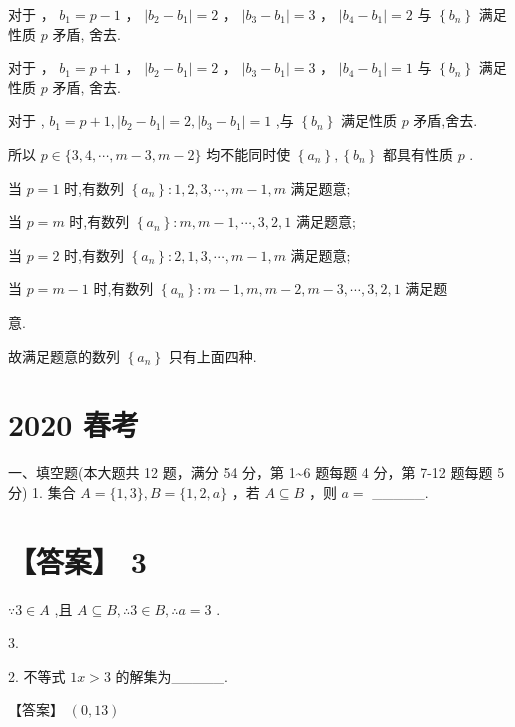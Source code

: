 \documentclass[10pt]{article}
\newcommand*\circled[1]{\tikz[baseline=(char.base)]{\node[shape=circle,draw,inner sep=1.5pt] (char) {\small #1};}}
\begin{document}
对于 \circled{2} ， \({b}_{1} = p - 1\) ， \(\left| {{b}_{2} - {b}_{1}}\right|  = 2\) ， \(\left| {{b}_{3} - {b}_{1}}\right|  = 3\) ， \(\left| {{b}_{4} - {b}_{1}}\right|  = 2\) 与 \(\left\{  {b}_{n}\right\}\) 满足性质 \(p\) 矛盾, 舍去.

对于 \circled{3} ， \({b}_{1} = p + 1\) ， \(\left| {{b}_{2} - {b}_{1}}\right|  = 2\) ， \(\left| {{b}_{3} - {b}_{1}}\right|  = 3\) ， \(\left| {{b}_{4} - {b}_{1}}\right|  = 1\) 与 \(\left\{  {b}_{n}\right\}\) 满足性质 \(p\) 矛盾, 舍去.

对于 \circled{4} , \({b}_{1} = p + 1,\left| {{b}_{2} - {b}_{1}}\right|  = 2,\left| {{b}_{3} - {b}_{1}}\right|  = 1\) ,与 \(\left\{  {b}_{n}\right\}\) 满足性质 \(p\) 矛盾,舍去.

所以 \(p \in  \{ 3,4,\cdots ,m - 3,m - 2\}\) 均不能同时使 \(\left\{  {a}_{n}\right\}  ,\left\{  {b}_{n}\right\}\) 都具有性质 \(p\) .

当 \(p = 1\) 时,有数列 \(\left\{  {a}_{n}\right\}   : 1,2,3,\cdots ,m - 1,m\) 满足题意;

当 \(p = m\) 时,有数列 \(\left\{  {a}_{n}\right\}   : m,m - 1,\cdots ,3,2,1\) 满足题意;

当 \(p = 2\) 时,有数列 \(\left\{  {a}_{n}\right\}   : 2,1,3,\cdots ,m - 1,m\) 满足题意;

当 \(p = m - 1\) 时,有数列 \(\left\{  {a}_{n}\right\}   : m - 1,m,m - 2,m - 3,\cdots ,3,2,1\) 满足题

意.

故满足题意的数列 \(\left\{  {a}_{n}\right\}\) 只有上面四种.

\section*{2020 春考}

一、填空题(本大题共 12 题，满分 54 分，第 1\textasciitilde 6 题每题 4 分，第 7-12 题每题 5 分) 1. 集合 \(A = \{ 1,3\} ,B = \{ 1,2,a\}\) ，若 \(A \subseteq  B\) ，则 \(a =\) \_\_\_\_\_.

\section*{【答案】 3}

\(\because 3 \in  A\) ,且 \(A \subseteq  B,\therefore 3 \in  B,\therefore a = 3\) .

3.

2. 不等式 \({1x} > 3\) 的解集为\_\_\_\_\_.

【答案】 \(\left( {0,{13}}\right)\)
\end{document}
